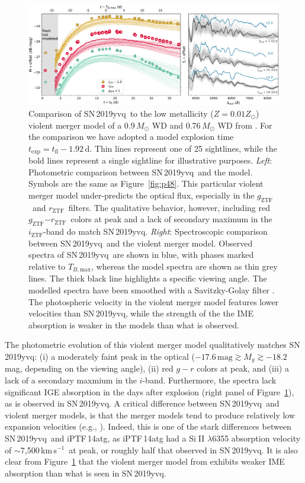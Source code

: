 \documentclass[twocolumn]{aastex63}
\def\ion#1#2{#1$\;${\footnotesize\rm{#2}}\relax}
\newcommand{\rztf}{$r_\mathrm{ZTF}$}
\newcommand{\gztf}{$g_\mathrm{ZTF}$}
\newcommand{\iztf}{$i_\mathrm{ZTF}$}
\newcommand{\tbmax}{$T_{B,\mathrm{max}}$}
\newcommand{\kms}{km\,s$^{-1}$}
\newcommand{\sn}{SN\,2019yvq}
\begin{document}
\begin{figure}
    \centering
    \includegraphics[width=\textwidth]{./figures/violent_merger.pdf}
    \caption{Comparison of \sn\ to the low metallicity ($Z = 0.01 Z_\odot$)
    violent merger model of a 0.9\,$M_\odot$ WD and 0.76\,$M_\odot$ WD from
    \citet{Kromer16}. For the comparison we have adopted a model explosion
    time $t_\mathrm{exp} = t_\mathrm{fl} - 1.92$\,d. Thin lines represent one
    of 25 sightlines, while the bold lines represent a single sightline for
    illustrative purposes. \textit{Left}: Photometric comparison between \sn\
    and the model. Symbols are the same as Figure~\ref{fig:p48}. This
    particular violent merger model under-predicts the optical flux,
    especially in the \gztf\ and \rztf\ filters. The qualitative behavior,
    however, including red \gztf$ - $\rztf\ colors at peak and a lack of
    secondary maximum in the \iztf-band do match \sn. \textit{Right}:
    Spectroscopic comparison between \sn\ and the violent merger model.
    Observed spectra of \sn\ are shown in blue, with phases marked relative to
    \tbmax, whereas the model spectra are shown as thin grey lines. The thick
    black line highlights a specific viewing angle. The modelled spectra have
    been smoothed with a Savitzky-Golay filter \citep{Savitzky64}. The
    photospheric velocity in the violent merger model features lower
    velocities than \sn, while the strength of the the IME absorption is
    weaker in the models than what is observed.}
    \label{fig:violent_merger}
\end{figure}

The photometric evolution of this violent merger model qualitatively matches
\sn: (i) a moderately faint peak in the optical ($-17.6\,\mathrm{mag} \gtrsim
M_g \gtrsim -18.2$\,mag, depending on the viewing angle), (ii) red $g - r$
colors at peak, and (iii) a lack of a secondary maxmium in the $i$-band.
Furthermore, the spectra lack significant IGE absorption in the days after
explosion (right panel of Figure~\ref{fig:violent_merger}), as is observed in
\sn. A critical difference between \sn\ and violent merger models, is that the
merger models tend to produce relatively low expansion velocities (e.g.,
\citealt{Pakmor10,Kromer13a,Kromer16}). Indeed, this is one of the stark
differences between \sn\ and iPTF\,14atg, as iPTF\,14atg had a \ion{Si}{II}
$\lambda$6355 absorption velocity of $\sim$7,500\,\kms\ at peak, or roughly
half that observed in \sn. It is also clear from
Figure~\ref{fig:violent_merger} that the violent merger model from
\citet{Kromer16} exhibits weaker IME absorption than what is seen in \sn.
\end{document}
